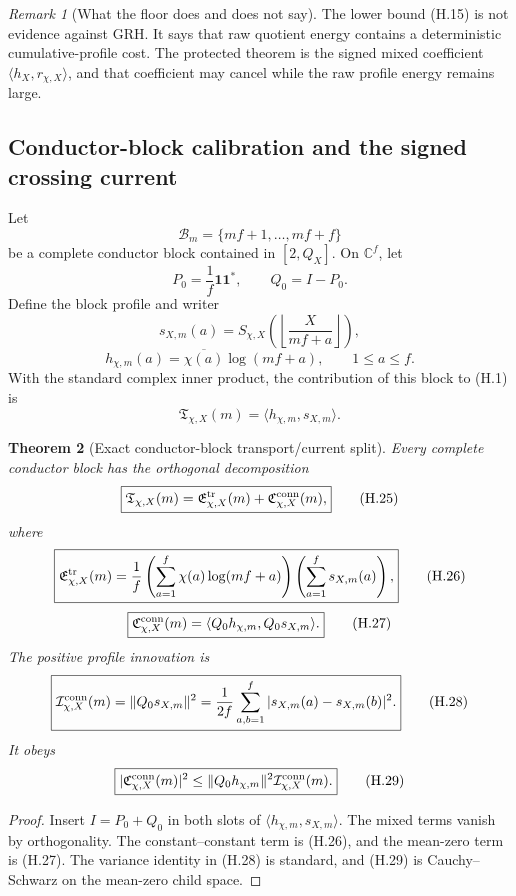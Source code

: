 \documentclass[11pt]{article}
\newtheorem{theorem}{Theorem}[section]
\theoremstyle{definition}
\theoremstyle{remark}
\newtheorem{remark}[theorem]{Remark}
\newcommand{\one}{\mathbf 1}
\begin{document}
\begin{remark}[What the floor does and does not say]
The lower bound \textup{(H.15)} is not evidence against GRH.  It says that
raw quotient energy contains a deterministic cumulative-profile cost.  The
protected theorem is the signed mixed coefficient
\(\langle h_X,r_{\chi,X}\rangle\), and that coefficient may cancel while the
raw profile energy remains large.
\end{remark}

\subsection{Conductor-block calibration and the signed crossing current}
\label{subsec:hyperbola-conductor-blocks}

Let
\[
 \mathcal B_m
 =\{mf+1,\ldots,mf+f\}
 \tag{H.20}
\]
be a complete conductor block contained in \([2,Q_X]\).  On
\(\mathbb C^f\), let
\[
 P_0=\frac1f\one\one^*,
 \qquad
 Q_0=I-P_0.
 \tag{H.21}
\]
Define the block profile and writer
\[
 s_{X,m}(a)
 =S_{\chi,X}\!\left(
   \left\lfloor\frac{X}{mf+a}\right\rfloor
  \right),
 \tag{H.22}
\]
\[
 h_{\chi,m}(a)
 =\overline{\chi(a)}\log(mf+a),
 \qquad 1\le a\le f.
 \tag{H.23}
\]
With the standard complex inner product, the contribution of this block to
\textup{(H.1)} is
\[
 \mathfrak T_{\chi,X}(m)
 =\langle h_{\chi,m},s_{X,m}\rangle.
 \tag{H.24}
\]

\begin{theorem}[Exact conductor-block transport/current split]
\label{thm:hyperbola-block-split}
Every complete conductor block has the orthogonal decomposition
\[
 \boxed{
 \mathfrak T_{\chi,X}(m)
 =\mathfrak E_{\chi,X}^{\rm tr}(m)
  +\mathfrak C_{\chi,X}^{\rm conn}(m),}
 \tag{H.25}
\]
where
\[
 \boxed{
 \mathfrak E_{\chi,X}^{\rm tr}(m)
 =\frac1f
  \left(\sum_{a=1}^f\chi(a)\log(mf+a)\right)
  \left(\sum_{a=1}^fs_{X,m}(a)\right),}
 \tag{H.26}
\]
\[
 \boxed{
 \mathfrak C_{\chi,X}^{\rm conn}(m)
 =\langle Q_0h_{\chi,m},Q_0s_{X,m}\rangle.}
 \tag{H.27}
\]
The positive profile innovation is
\[
 \boxed{
 \mathcal I_{\chi,X}^{\rm conn}(m)
 =\|Q_0s_{X,m}\|^2
 =\frac1{2f}\sum_{a,b=1}^f
  |s_{X,m}(a)-s_{X,m}(b)|^2.}
 \tag{H.28}
\]
It obeys
\[
 \boxed{
 |\mathfrak C_{\chi,X}^{\rm conn}(m)|^2
 \le
 \|Q_0h_{\chi,m}\|^2
 \mathcal I_{\chi,X}^{\rm conn}(m).}
 \tag{H.29}
\]
\end{theorem}

\begin{proof}
Insert \(I=P_0+Q_0\) in both slots of
\(\langle h_{\chi,m},s_{X,m}\rangle\).  The mixed terms vanish by
orthogonality.  The constant--constant term is \textup{(H.26)}, and the
mean-zero term is \textup{(H.27)}.  The variance identity in
\textup{(H.28)} is standard, and \textup{(H.29)} is Cauchy--Schwarz on
the mean-zero child space.
\end{proof}
\end{document}
